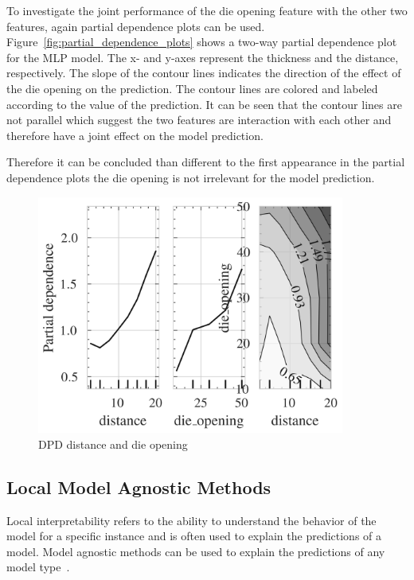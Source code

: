 To investigate the joint performance of the die opening feature with the other two features,
again partial dependence plots can be used.
Figure~\ref{fig:partial_dependence_plots} shows a two-way partial dependence plot for the
\ac{MLP} model.
The x- and y-axes represent the thickness and the distance, respectively.
The slope of the contour lines indicates the direction of the effect of the die opening on the
prediction.
The contour lines are colored and labeled according to the value of the prediction.
It can be seen that the contour lines are not parallel which suggest the two features are
interaction with each other and therefore have a joint effect on the model prediction.

Therefore it can be concluded than different to the first appearance in the partial dependence
plots the die opening is not irrelevant for the model prediction.

\begin{figure}[H]
    \begin{tcolorbox}[arc=0pt,boxrule=0.5pt]
        \centering
        \includegraphics[width=0.9\textwidth]{chap5/images/pdp_distance_die_opening}
    \end{tcolorbox}
    \caption{DPD distance and die opening}
    \label{fig:dpd-distance-die-opening}
\end{figure}

\subsection*{Local Model Agnostic Methods}
Local interpretability refers to the ability to understand the behavior of the model for a
specific instance and is often used to explain the predictions of a model.
Model agnostic methods can be used to explain the predictions of any model type~\cite{
    molnar2020interpretable}.

